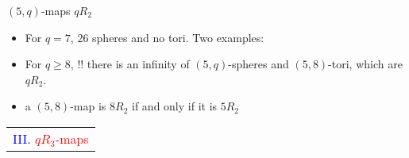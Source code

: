 \documentclass[%
pdf,
colorBG,
slideColor,
]{prosper}
\begin{document}
\begin{slide}{$(5,q)$-maps $qR_2$}
\begin{itemize}
\item For $q=7$, $26$ spheres and no tori. Two examples:
\begin{center}
\begin{minipage}{37mm}
\centering
{}\par
\end{minipage}
\begin{minipage}{37mm}
\centering
{}\par
\end{minipage}
\end{center}
\item For $q\geq 8$, 
!!%
there is an infinity of $(5,q)$-spheres
and $(5,8)$-tori, which are $qR_2$.
\item a $(5,8)$-map is $8R_2$ if and only if it is $5R_2$

\end{itemize}
\end{slide}
















\begin{slide}{}
\begin{center}
{\Huge 
\begin{tabular*}{7cm}{c}
\\[-0.5cm]
\textcolor{blue}{III. }\textcolor{red}{$qR_3$-maps}
\end{tabular*}
}
\end{center}
\end{slide}
\end{document}

